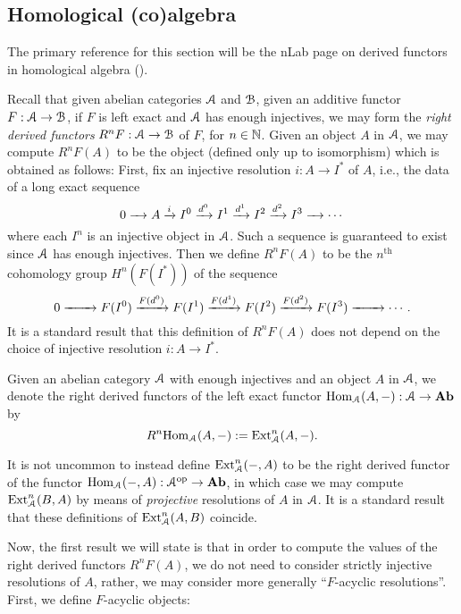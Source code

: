 \documentclass[../main.tex]{subfiles}
\begin{document}
\subsection{Homological (co)algebra}

The primary reference for this section will be the nLab page on derived functors in homological algebra (\cite{nlab:derived_functor_in_homological_algebra}).

Recall that given abelian categories $\mathcal A$ and $\mathcal B$, given an additive functor $F:\mathcal A\to\mathcal B$, if $F$ is left exact and $\mathcal A$ has enough injectives, we may form the \emph{right derived functors} $R^nF:\mathcal A\to\mathcal B$ of $F$, for $n\in\mathbb{N}$. Given an object $A$ in $\mathcal A$, we may compute $R^nF(A)$ to be the object (defined only up to isomorphism) which is obtained as follows: First, fix an injective resolution $i:A\to I^*$ of $A$, i.e., the data of a long exact sequence
\[0\xrightarrow{\phantom{d^2}}A\xrightarrow{i}I^0\xrightarrow{d^0}I^1\xrightarrow{d^1}I^2\xrightarrow{d^2}I^3\xrightarrow{\phantom{d^2}}\cdots\]
where each $I^n$ is an injective object in $\mathcal A$. Such a sequence is guaranteed to exist since $\mathcal A$ has enough injectives. Then we define $R^nF(A)$ to be the $n^\text{th}$ cohomology group $H^n(F(I^*))$ of the sequence
\[0\xrightarrow{\phantom{F(d^2)}}F(I^0)\xrightarrow{F(d^0)}F(I^1)\xrightarrow{F(d^1)}F(I^2)\xrightarrow{F(d^2)}F(I^3)\xrightarrow{\phantom{F(d^2)}}\cdots.\]
It is a standard result that this definition of $R^nF(A)$ does not depend on the choice of injective resolution $i:A\to I^*$. 

\begin{definition}\label{defn:Ext}
	Given an abelian category $\mathcal A$ with enough injectives and an object $A$ in $\mathcal A$, we denote the right derived functors of the left exact functor $\mathrm{Hom}_\mathcal A(A,-):\mathcal A\to\mathbf{Ab}$ by
	\[R^n\mathrm{Hom}_\mathcal A(A,-):=\mathrm{Ext}^n_\mathcal A(A,-).\]
\end{definition}

\begin{remark}
	It is not uncommon to instead define $\mathrm{Ext}^n_\mathcal A(-,A)$ to be the right derived functor of the functor $\mathrm{Hom}_\mathcal A(-,A):\mathcal A^{\mathrm{op}}\to\mathbf{Ab}$, in which case we may compute $\mathrm{Ext}^n_\mathcal A(B,A)$ by means of \emph{projective} resolutions of $A$ in $\mathcal A$. It is a standard result that these definitions of $\mathrm{Ext}^n_\mathcal A(A,B)$ coincide.
\end{remark}

Now, the first result we will state is that in order to compute the values of the right derived functors $R^nF(A)$, we do not need to consider strictly injective resolutions of $A$, rather, we may consider more generally ``$F$-acyclic resolutions''. First, we define $F$-acyclic objects:
\end{document}
